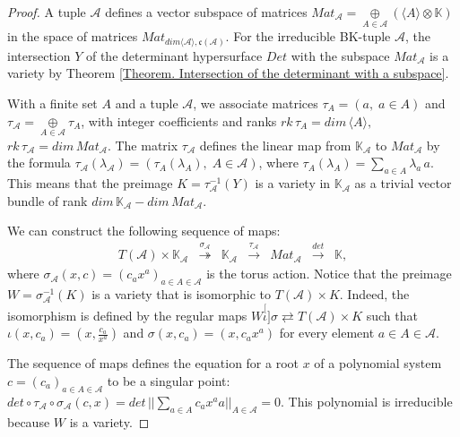 \documentclass[11pt]{article}
\theoremstyle{plain}
\theoremstyle{definition}
\theoremstyle{remark}
\theoremstyle{plain}
\theoremstyle{plain}
\theoremstyle{plain}
\theoremstyle{definition}
\begin{document}
\begin{proof}
A tuple $\mathscr{A}$ defines a vector subspace of matrices $Mat_{\mathscr{A}}=\underset{A\in\mathscr{A}}{\oplus}(\langle A\rangle\otimes\mathbb{K})$
in the space of matrices $Mat_{dim\langle\mathscr{A}\rangle,\mathfrak{c}(\mathscr{A})}$.
For the irreducible BK-tuple $\mathscr{A}$, the intersection $Y$
of the determinant hypersurface $Det$ with the subspace $Mat_{\mathscr{A}}$
is a variety by Theorem \ref{Theorem. Intersection of the determinant with a subspace}.

With a finite set $A$ and a tuple $\mathscr{A}$, we associate matrices
$\tau_{A}=(a,\;a\in A)$ and $\tau_{\mathscr{A}}=\underset{A\in\mathscr{A}}{\oplus}\tau_{A}$,
with integer coefficients and ranks $rk\,\tau_{A}=dim\,\langle A\rangle,$
$rk\,\tau_{\mathscr{A}}=dim\,Mat_{\mathscr{A}}$. The matrix $\tau_{\mathscr{A}}$
defines the linear map from $\mathbb{K}_{\mathscr{A}}$ to $Mat_{\mathscr{A}}$
by the formula $\tau_{\mathscr{A}}(\lambda_{\mathscr{A}})=(\tau_{A}(\lambda_{A}),\;A\in\mathscr{A})$,
where $\tau_{A}(\lambda_{A})=\underset{a\in A}{\sum}\lambda_{a}\,a$.
This means that the preimage $K=\tau_{\mathscr{A}}^{-1}(Y)$ is a
variety in $\mathbb{K}_{\mathscr{A}}$ as a trivial vector bundle
of rank $dim\,\mathbb{K}_{\mathscr{A}}-dim\,Mat_{\mathscr{A}}$.

We can construct the following sequence of maps:
\[
\begin{array}{ccccccc}
T(\mathscr{A})\times\mathbb{K}_{\mathscr{A}} & \overset{\sigma_{\mathscr{A}}}{\twoheadrightarrow} & \mathbb{K}_{\mathscr{A}} & \overset{\tau_{\mathscr{A}}}{\rightarrow} & Mat_{\mathscr{A}} & \overset{det}{\rightarrow} & \mathbb{K},\end{array}
\]
where $\sigma_{\mathscr{A}}(x,c)=(c_{a}x^{a})_{a\in A\in\mathscr{A}}$
is the torus action. Notice that the preimage $W=\sigma_{\mathscr{A}}^{-1}(K)$
is a variety that is isomorphic to $T(\mathscr{A})\times K$. Indeed,
the isomorphism is defined by the regular maps $W\stackrel[\iota]{\sigma}{\rightleftarrows}T(\mathscr{A})\times K$
such that $\iota(x,c_{a})=(x,\frac{c_{a}}{x^{a}})$ and $\sigma(x,c_{a})=(x,c_{a}x^{a})$
for every element $a\in A\in\mathscr{A}.$

The sequence of maps defines the equation for a root $x$ of a polynomial
system $c=(c_{a})_{a\in A\in\mathscr{A}}$ to be a singular point:
$det\circ\tau_{\mathscr{A}}\circ\sigma_{\mathscr{A}}(c,x)=det\,||\underset{a\in A}{\sum}c_{a}x^{a}a||_{A\in\mathscr{A}}=0.$
This polynomial is irreducible because $W$ is a variety.


\end{proof}
\end{document}
